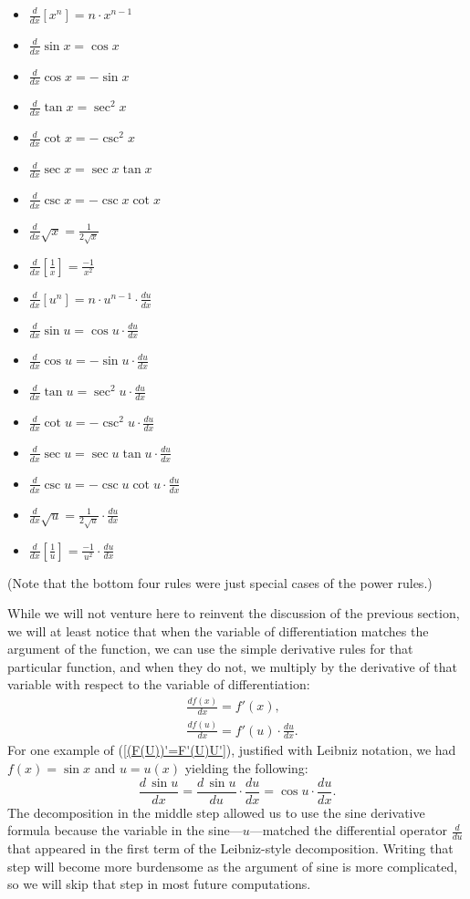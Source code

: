 \begin{multicols}{2}
\begin{itemize}
\item ${\frac{d}{dx}\left[x^n\right]=n\cdot x^{n-1}}$
\item ${\frac{d}{dx}\sin x=\cos x}$
\item ${\frac{d}{dx}\cos x=-\sin x}$
\item ${\frac{d}{dx}\tan x=\sec^2x}$
\item ${\frac{d}{dx}\cot x=-\csc^2x}$
\item ${\frac{d}{dx}\sec x=\sec x\tan x}$
\item ${\frac{d}{dx}\csc x=-\csc x\cot x}$
\item ${\frac{d}{dx}\sqrt{x}=\frac1{2\sqrt{x}}}$
\item ${\frac{d}{dx}\left[\frac1x\right]=\frac{-1}{x^2}}$
\item ${\frac{d}{dx}\left[u^n\right]=n\cdot u^{n-1}\cdot\frac{du}{dx}}$
\item ${\frac{d}{dx}\sin u=\cos u\cdot\frac{du}{dx}}$
\item ${\frac{d}{dx}\cos u=-\sin u\cdot\frac{du}{dx}}$
\item ${\frac{d}{dx}\tan u=\sec^2u\cdot\frac{du}{dx}}$
\item ${\frac{d}{dx}\cot u=-\csc^2u\cdot\frac{du}{dx}}$
\item ${\frac{d}{dx}\sec u=\sec u\tan u\cdot\frac{du}{dx}}$
\item ${\frac{d}{dx}\csc u=-\csc u\cot u\cdot\frac{du}{dx}}$
\item ${\frac{d}{dx}\sqrt{u}=\frac1{2\sqrt{u}}\cdot\frac{du}{dx}}$
\item ${\frac{d}{dx}\left[\frac1u\right]=\frac{-1}{u^2}\cdot\frac{du}{dx}}$

\end{itemize}
\end{multicols}
(Note that the bottom four rules were just special cases of the power rules.)

While we will not venture here to reinvent the discussion of the
previous section, we will at least notice that when  the variable
of differentiation matches the argument of the function,
we can use the simple derivative rules for that particular function,
and when they do not, we multiply by the derivative of that variable
with respect to the variable of differentiation:
\begin{align}
&\frac{d f(x)}{dx}=f'(x),\\
&\frac{d f(u)}{dx}=f'(u)\cdot\frac{du}{dx}.\label{(F(U))'=F'(U)U'}
\end{align}
For one example of (\ref{(F(U))'=F'(U)U'}), justified with  
Leibniz notation, we
had $f(x)=\sin x$ and $u=u(x)$ yielding the following:
$$\frac{d\,\sin u}{dx}=\frac{d\,\sin u}{du}\cdot\frac{du}{dx}=\cos u\cdot
\frac{du}{dx}.$$
The decomposition in the middle step
allowed us to use the sine derivative formula 
because the variable in the sine---$u$---matched the 
differential operator $\frac{d}{du}$ that appeared in the first term
of the Leibniz-style decomposition.  Writing that step will
become more burdensome as the argument of sine is more complicated,
so we will skip that step in most future computations.


